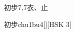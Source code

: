 \begin{entry}{初步}{7,7}{⾐、⽌}
  \begin{phonetics}{初步}{chu1bu4}[][HSK 3]
  \end{phonetics}
\end{entry}
